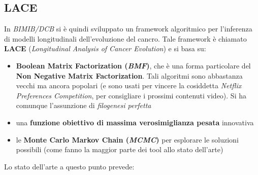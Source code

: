 \documentclass[a4paper,12pt, oneside]{book}
\begin{document}
\subsection{LACE}
In \textit{BIMIB/DCB} si è quindi sviluppato un framework algoritmico per
l'inferenza di modelli longitudinali dell'evoluzione del cancro. Tale framework
è chiamato \textbf{LACE} (\textit{Longitudinal Analysis of Cancer Evolution}) e
si basa su:
\begin{itemize}
  \item \textbf{Boolean Matrix Factorization (\textit{BMF})}, che è una forma
  particolare del \textbf{Non Negative Matrix Factorization}. Tali algoritmi
  sono abbastanza vecchi ma ancora popolari (e sono usati per vincere la
  cosiddetta \textit{Netflix Preferences Competition}, per consigliare i
  prossimi contenuti video). Si ha comunque l'assunzione di \textit{filogenesi
    perfetta} 
  \item una \textbf{funzione obiettivo di massima verosimiglianza pesata}
  innovativa
  \item le \textbf{Monte Carlo Markov Chain (\textit{MCMC})} per esplorare le
  soluzioni possibili (come fanno la maggior parte dei tool allo stato
  dell'arte) 
\end{itemize}
Lo stato dell'arte a questo punto prevede:
\end{document}
